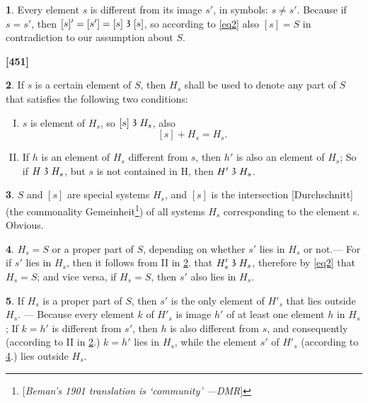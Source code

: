 \documentclass[leqno,hidelinks,a4paper]{article}
\theoremstyle{definition}
\newtheorem{satz}{\protect\satzname}
\newtheorem{deff}[satz]{\protect\deffname}
\newcommand{\satzname}{}
\newcommand{\deffname}{}
\renewcommand{\satzname}{\hspace{-4pt}.\ Satz}%
\renewcommand{\deffname}{\hspace{-4pt}.\ Definition}%
\renewcommand{\satzname}{\hspace{-4pt}.\ Theorem}%
\renewcommand{\deffname}{\hspace{-4pt}.\ Definition}%
\newcommand\partof{\mathrel{\raisebox{0.45ex}{$\mathfrak{3}$}}}
\begin{document}
\begin{satz}\label{thm2}
Every element $s$ is different from its image $s'$, in symbols: $s \neq s'$.
Because if $s = s'$, then $[s]' = [s'] = [s] \partof [s]$, so according to \eqref{eq2} also $[s] = S$ in contradiction to our assumption about $S$.
\end{satz}

\textbf{[451]}


\begin{deff}\label{def3}
If $s$ is a certain element of $S$, then $H_s$ shall be used to denote any part of $S$ that satisfies the following two conditions:
\begin{enumerate}[I.]
\item $s$ is element of $H_s$, so $[s] \partof H_s$, also
\[
	[s] + H_s = H_s.
\]
\item If $h$ is an element of $H_s$ different from $s$, then $h'$ is also an element of $H_s$; So if $H \partof H_s$, but $s$ is not contained in H, then $H' \partof H_s$.
\end{enumerate}
\end{deff}

 \begin{satz}\label{thm4}
 $S$ and $[s]$ are special systems $H_s$, and $[s]$ is the intersection [Durchschnitt] (the commonality Gemeinheit\footnote{[\emph{Beman's 1901 translation is `community' ---DMR}]}) of all systems $H_s$ corresponding to the element s. Obvious.\end{satz}

\begin{satz}\label{thm5}
$H_s = S$ or a proper part of $S$, depending on whether $s'$ lies in $H_s$ or not.--- For if $s'$ lies in $H_s$, then it follows from II in \ref{def3}. that $H'_s \partof H_s$, therefore by \eqref{eq2} that $H_s = S$; and vice versa, if $H_s = S$, then $s'$ also lies in $H_s$.\end{satz}



\begin{satz}\label{thm6}
 If $H_s$ is a proper part of $S$, then $s'$ is the only element of $H'_s$ that lies outside $H_s$.
--- Because every element $k$ of $H'_s$ is image $h'$ of at least one element $h$ in $H_s$;
If $k=h'$ is different from $s'$, then $h$ is also different from $s$, and consequently (according to II in \ref{def3}.) $k = h'$ lies in $H_s$, while the element $s'$ of $H'_s$ (according to \ref{thm5}.) lies outside $H_s$.
\end{satz}
\end{document}
